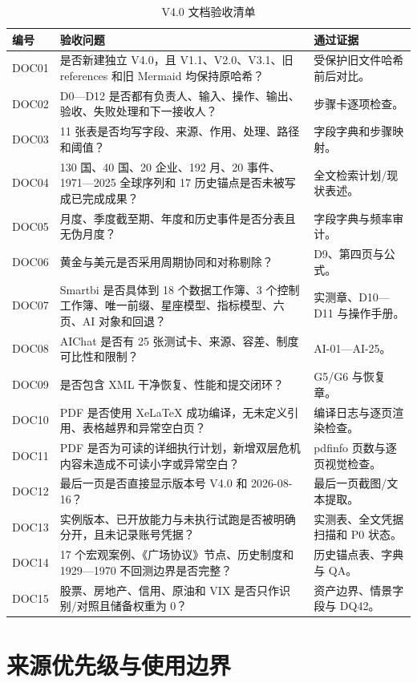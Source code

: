 \documentclass[UTF8,fontset=windows,12pt,openany]{ctexbook}
\begin{document}
\begin{longtable}{p{1.8cm}p{8.0cm}p{4.2cm}}
\caption{V4.0 文档验收清单}\label{tab:document-qa}\\
\toprule
\textbf{编号} & \textbf{验收问题} & \textbf{通过证据}\\
\midrule
DOC01 & 是否新建独立 V4.0，且 V1.1、V2.0、V3.1、旧 references 和旧 Mermaid 均保持原哈希？ & 受保护旧文件哈希前后对比。\\
DOC02 & D0—D12 是否都有负责人、输入、操作、输出、验收、失败处理和下一接收人？ & 步骤卡逐项检查。\\
DOC03 & 11 张表是否均写字段、来源、作用、处理、路径和阈值？ & 字段字典和步骤映射。\\
DOC04 & 130 国、40 国、20 企业、192 月、20 事件、1971—2025 全球序列和 17 历史锚点是否未被写成已完成成果？ & 全文检索计划/现状表述。\\
DOC05 & 月度、季度截至期、年度和历史事件是否分表且无伪月度？ & 字段字典与频率审计。\\
DOC06 & 黄金与美元是否采用周期协同和对称剔除？ & D9、第四页与公式。\\
DOC07 & Smartbi 是否具体到 18 个数据工作簿、3 个控制工作簿、唯一前缀、星座模型、指标模型、六页、AI 对象和回退？ & 实测章、D10—D11 与操作手册。\\
DOC08 & AIChat 是否有 25 张测试卡、来源、容差、制度可比性和限制？ & AI-01—AI-25。\\
DOC09 & 是否包含 XML 干净恢复、性能和提交闭环？ & G5/G6 与恢复章。\\
DOC10 & PDF 是否使用 XeLaTeX 成功编译，无未定义引用、表格越界和异常空白页？ & 编译日志与逐页渲染检查。\\
DOC11 & PDF 是否为可读的详细执行计划，新增双层危机内容未造成不可读小字或异常空白？ & pdfinfo 页数与逐页视觉检查。\\
DOC12 & 最后一页是否直接显示版本号 V4.0 和 2026-08-16？ & 最后一页截图/文本提取。\\
DOC13 & 实例版本、已开放能力与未执行试跑是否被明确分开，且未记录账号凭据？ & 实测表、全文凭据扫描和 P0 状态。\\
DOC14 & 17 个宏观案例、《广场协议》节点、历史制度和 1929—1970 不回测边界是否完整？ & 历史锚点表、字典与 QA。\\
DOC15 & 股票、房地产、信用、原油和 VIX 是否只作识别/对照且储备权重为 0？ & 资产边界、情景字段与 DQ42。\\
\bottomrule
\end{longtable}

\appendix

\chapter{来源优先级与使用边界}
\end{document}
